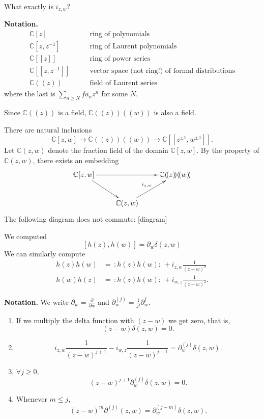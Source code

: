 What exactly is $i_{z,w}$?

\medskip\noindent
{\bf Notation.}
\begin{align*}
\mathbb{C}[z]&\qquad \text{ring of polynomials}\\
\mathbb{C}[z,z^{-1}]&\qquad \text{ring of Laurent polynomials}\\
\mathbb{C}[\![z ]\!]&\qquad \text{ring of power series}\\
\mathbb{C}[\![z,z^{-1}]\!]&  \qquad \text{vector space (not ring!) of formal
distributions}\\
\mathbb{C}(\!(z)\!)&\qquad \text{field of Laurent series}
\end{align*}
where the last is $\sum_{n \geq N}fa_n z^n$ for some $N$.

Since $\mathbb{C}(\!(z)\!)$ is a field, $\mathbb{C}(\!(z)\!)(\!(w)\!)$ is
also a field.

There are natural inclusions
$$
\mathbb{C}[z,w] \to \mathbb{C}(\!(z)\!)(\!(w)\!) \to
\mathbb{C}[\![z^{\pm1},w^{\pm 1}]\!].
$$
Let $\mathbb{C}(z,w)$ denote the fraction field
of the domain $\mathbb{C}[z,w]$.
By the property of $\mathbb{C}(z,w)$, there exists an embedding
$$
\xymatrix{
\mathbb{C}[z,w]\ar[rr]\ar[dr]&  &  \mathbb{C}(\!(z)\!)(\!(w)\!)\\
&\mathbb{C}(z,w)\ar[ur]^{i_{z,w}}
}
$$
The following diagram does not commute: [diagram]

We computed
$$
[h(z),h(w)]=\partial_w \delta(z,w)
$$
We can similarly compute
\begin{align*}
h(z)h(w)&=\,:\!h(z)h(w)\!:\,+i_{z,w}\frac{1}{(z-w)^2}\\
h(w)h(z)&=\,:\!h(z)h(w)\!:\,+i_{w,z}\frac{1}{(z-w)^2}.
\end{align*}

\medskip\noindent
{\bf Notation.} We write $\partial_w=\frac{\partial }{\partial w}$ and
$\partial^{(j)}_w=\frac{1}{j!}\partial^j_w$.

\begin{lemma}
\label{lemma-elementary}
\begin{enumerate}
\item If we multiply the delta function with $(z-w)$ we get zero, that is,
$$
(z-w)\delta(z,w)=0.
$$
\item 
$$
i_{z,w}\frac{1}{(z-w)^{j+1}}-i_{w,z}\frac{1}{(z-w)^{j+1}}
=\partial_w^{(j)}\delta(z,w).
$$
\item $\forall j\geq 0$,
$$
(z-w)^{j+1}\partial_w^{(j)}\delta(z,w)=0.
$$
\item Whenever $m \leq j$,
$$
(z-w)^m\partial^{(j)}(z,w)=\partial_w^{(j-m)}\delta(z,w).
$$
\end{enumerate}
\end{lemma}

